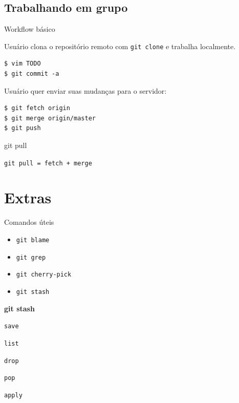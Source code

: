 \documentclass[portuguese,brazil]{beamer}
\newcommand\singlephrase[1]{
  \begin{center}
    \huge #1
  \end{center}
}
\begin{document}
\subsection{Trabalhando em grupo}

\begin{frame}[fragile]{Workflow básico}
\begin{center}
Usuário clona o repositório remoto com \texttt{git clone} e trabalha localmente.
\end{center}
\pause
\begin{verbatim}
$ vim TODO 
$ git commit -a
\end{verbatim}
\pause
\begin{center}
Usuário quer enviar suas mudanças para o servidor:
\end{center}
\begin{verbatim}
$ git fetch origin
$ git merge origin/master
$ git push
\end{verbatim}
\end{frame}

\begin{frame}{git pull}
  \singlephrase{\texttt{git pull = fetch + merge}}
\end{frame}

\section{Extras}

\begin{frame}{Comandos úteis}
  \begin{itemize}
    \item \texttt{git blame}
    \pause
    \item \texttt{git grep}
    \pause
    \item \texttt{git cherry-pick}
    \pause
    \item \texttt{git stash}
  \end{itemize}
\end{frame}

\begin{frame}[fragile]
  \begin{center}
    \huge \textbf{git stash}
    \item \texttt{save}
    \pause
    \item \texttt{list}
    \pause
    \item \texttt{drop}
    \pause
    \item \texttt{pop}
    \pause
    \item \texttt{apply}
  \end{center}
\end{frame}
\end{document}
